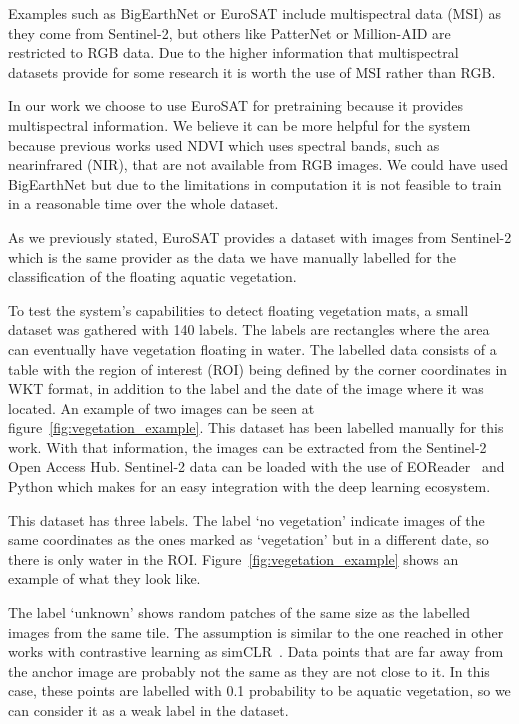 \documentclass[conference]{IEEEtran}
\begin{document}
    Examples such as BigEarthNet or EuroSAT include multispectral data (MSI) as they come from Sentinel-2, but others like PatterNet or Million-AID are restricted to RGB data.
    Due to the higher information that multispectral datasets provide for some research it is worth the use of MSI rather than RGB\@.

    In our work we choose to use EuroSAT for pretraining because it provides multispectral information.
    We believe it can be more helpful for the system because previous works used NDVI which uses spectral bands, such as nearinfrared (NIR), that are not available from RGB images.
    We could have used BigEarthNet but due to the limitations in computation it is not feasible to train in a reasonable time over the whole dataset.

    As we previously stated, EuroSAT provides a dataset with images from Sentinel-2 which is the same provider as the data
    we have manually labelled for the classification of the floating aquatic vegetation.

    To test the system's capabilities to detect floating vegetation mats, a small dataset was gathered with 140 labels.
    The labels are rectangles where the area can eventually have vegetation floating in water.
    The labelled data consists of a table with the region of interest (ROI) being defined by the corner coordinates in WKT format, in addition to
    the label and the date of the image where it was located.
    An example of two images can be seen at figure~\ref{fig:vegetation_example}.
    This dataset has been labelled manually for this work.
    With that information, the images can be extracted from the Sentinel-2 Open Access Hub.
    Sentinel-2 data can be loaded with the use of EOReader~\cite{eoreader_paper} and Python which makes for an easy integration with the deep learning ecosystem.

    This dataset has three labels.
    The label `no vegetation' indicate images of the same coordinates as the ones marked as `vegetation' but in a different date, so there is only water in the ROI\@.
    Figure~\ref{fig:vegetation_example} shows an example of what they look like.

    The label `unknown' shows random patches of the same size as the labelled images from the same tile.
    The assumption is similar to the one reached in other works with contrastive learning as simCLR~\cite{chen2020simple, jean2019tile2vec}.
    Data points that are far away from the anchor image are probably not the same as they are not close to it.
    In this case, these points are labelled with 0.1 probability to be aquatic vegetation, so we can consider it as a weak label in the dataset.
\end{document}
